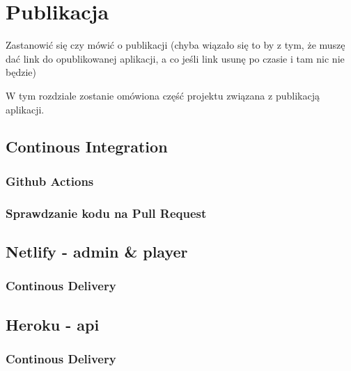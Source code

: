 \chapter{Publikacja}
\label{ch:funplenop}

Zastanowić się czy mówić o publikacji (chyba wiązało się to by z tym, że muszę dać link do opublikowanej aplikacji, a co jeśli link usunę po czasie i tam nic nie będzie)

W tym rozdziale zostanie omówiona część projektu związana z publikacją aplikacji.

\section{Continous Integration}
\subsection{Github Actions}
\subsection{Sprawdzanie kodu na Pull Request}

\section{Netlify - admin \& player}
\subsection{Continous Delivery}

\section{Heroku - api}
\subsection{Continous Delivery}